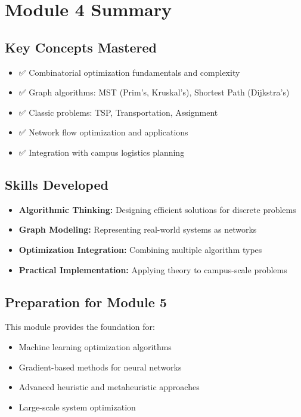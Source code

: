 \documentclass[
  letterpaper,
  DIV=11,
  numbers=noendperiod]{scrreprt}
\providecommand{\tightlist}{%
  \setlength{\itemsep}{0pt}\setlength{\parskip}{0pt}}
\begin{document}
\section{Module 4 Summary}\label{module-4-summary}

\subsection{Key Concepts Mastered}\label{key-concepts-mastered-1}

\begin{itemize}
\tightlist
\item
  ✅ Combinatorial optimization fundamentals and complexity
\item
  ✅ Graph algorithms: MST (Prim's, Kruskal's), Shortest Path
  (Dijkstra's)
\item
  ✅ Classic problems: TSP, Transportation, Assignment
\item
  ✅ Network flow optimization and applications
\item
  ✅ Integration with campus logistics planning
\end{itemize}

\subsection{Skills Developed}\label{skills-developed-1}

\begin{itemize}
\tightlist
\item
  \textbf{Algorithmic Thinking:} Designing efficient solutions for
  discrete problems
\item
  \textbf{Graph Modeling:} Representing real-world systems as networks
\item
  \textbf{Optimization Integration:} Combining multiple algorithm types
\item
  \textbf{Practical Implementation:} Applying theory to campus-scale
  problems
\end{itemize}

\subsection{Preparation for Module 5}\label{preparation-for-module-5}

This module provides the foundation for:

\begin{itemize}
\tightlist
\item
  Machine learning optimization algorithms
\item
  Gradient-based methods for neural networks
\item
  Advanced heuristic and metaheuristic approaches
\item
  Large-scale system optimization
\end{itemize}
\end{document}
